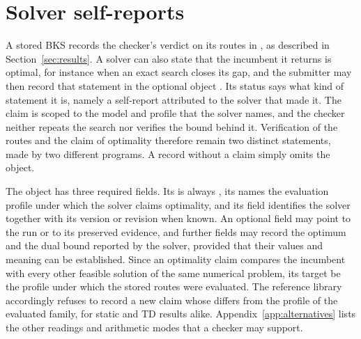 \section{Solver self-reports}\label{app:solver-claims}
A stored BKS records the checker's verdict on its routes in , as described in Section~\ref{sec:results}. A solver can also state that the incumbent it returns is optimal, for instance when an exact search closes its gap, and the submitter may then record that statement in the optional object . Its status  says what kind of statement it is, namely a self-report attributed to the solver that made it. The claim is scoped to the model and profile that the solver names, and the checker neither repeats the search nor verifies the bound behind it. Verification of the routes and the claim of optimality therefore remain two distinct statements, made by two different programs. A record without a claim simply omits the object.

The object has three required fields. Its  is always , its  names the evaluation profile under which the solver claims optimality, and its  field identifies the solver together with its version or revision when known. An optional  field may point to the run or to its preserved evidence, and further fields may record the optimum and the dual bound reported by the solver, provided that their values and meaning can be established. Since an optimality claim compares the incumbent with every other feasible solution of the same numerical problem, its target \must{} be the profile under which the stored routes were evaluated. The reference library accordingly refuses to record a new claim whose  differs from the profile of the evaluated family, for static and TD results alike. Appendix~\ref{app:alternatives} lists the other readings and arithmetic modes that a checker may support.

